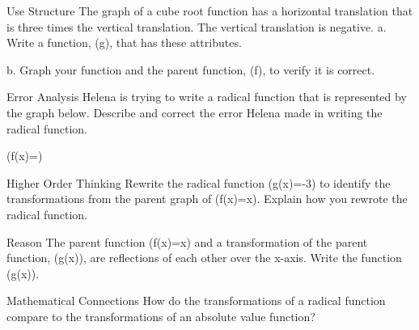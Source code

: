 \documentclass{article}
\newenvironment{practice}[2]{}{}        %
\newcommand{\answer}[1]{}               %
\newcommand{\placeholder}[2]{}          %
\newcommand{\te}[1]{}                   %
\begin{document}
\begin{practice}{12}{3}
Use Structure The graph of a cube root function has a horizontal translation that is three times the vertical translation. The vertical translation is negative.
a. Write a function, (g), that has these attributes.
\answer{a. Answers may vary: (g(x)=\sqrt[3]{x+3}-1)}
b. Graph your function and the parent function, (f), to verify it is correct.
\answer{b. Check students' graphs.}
\end{practice}
\begin{practice}{13}{2}
Error Analysis Helena is trying to write a radical function that is represented by the graph below. Describe and correct the error Helena made in writing the radical function.
\placeholder{graph}{Red 2sqrt(x-1), begins(1,0), increasing through approximately(2,2),(5,4), arrow up-right near(7,4.9). Axes x,y arrows both ends; unit grid x=-3 to 7,y=-3 to 5; labels x-2,2,4,6 and y-2,2,4; origin O. No dots.}
(f(x)=)
\te{A red X marks the expression.}
\answer{Helena did not consider the vertical stretch by a (\frac fg) factor of 2. The correct radical function is (f(x)=2\sqrt{x-1}).}
\te{Printed answer contains an anomalous stacked f/g before factor.}
\end{practice}
\begin{practice}{14}{2}
Higher Order Thinking Rewrite the radical function (g(x)=-3) to identify the transformations from the parent graph of (f(x)=\sqrt[3]x). Explain how you rewrote the radical function.
\answer{Factor the radicand: (g(x)=\sqrt[3]{8(x+8)}-3). Use the Product Property of Radicals: (g(x)=\sqrt[3]8\sqrt[3]{x+8}-3). Simplify: (h(x)=2\sqrt[3]{x+8}-3). The graph of (g(x)) is the vertical stretch of the parent function by a factor of 2 and a translation of 8 units to the left and 3 units down.}
\te{Printed h(x) in the simplify step; likely g(x).}
\end{practice}
\begin{practice}{15}{3}
Reason The parent function (f(x)=\sqrt x) and a transformation of the parent function, (g(x)), are reflections of each other over the x-axis. Write the function (g(x)).
\answer{(g(x)=-\sqrt x)}
\end{practice}
\begin{practice}{16}{1}
Mathematical Connections How do the transformations of a radical function compare to the transformations of an absolute value function?
\answer{For a radical function the transformations from a parent function (f(x)=\sqrt[n]x) can be represented by (g(x)=a\sqrt[n]{x-h}+k). In like manner, transformations of an absolute value function (f(x)=|x|) can be represented by (h(x)=a|x-h|+k). In both situations (a) represents the vertical stretch or compression, while (h) and (k) represent the vertical and horizontal shifts.}
\te{Printed vertical and horizontal for h and k respectively; likely horizontal and vertical.}
\end{practice}
\end{document}

